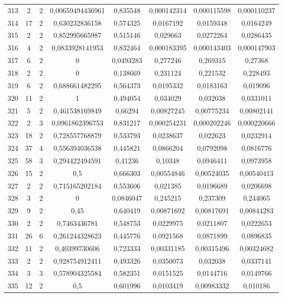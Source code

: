 \begin{longtable}{|c|c|c|c|c|c|c|c|}
313 & 2 & 2 & 0,00659494436961 & 0,835548 & 0,000142314 & 0,000115598 & 0,000110237  \\
314 & 17 & 2 & 0,630232836158 & 0,574325 & 0,0167192 & 0,0159348 & 0,0164249  \\
315 & 2 & 2 & 0,852995665987 & 0,515146 & 0,029663 & 0,0272264 & 0,0286435  \\
316 & 4 & 2 & 0,0833928141953 & 0,832464 & 0,000183395 & 0,000143403 & 0,000147903  \\
317 & 6 & 2 & 0 & 0,0493283 & 0,277246 & 0,269315 & 0,27368  \\
318 & 2 & 2 & 0 & 0,138669 & 0,231124 & 0,221532 & 0,228493  \\
319 & 6 & 2 & 0,688661482295 & 0,564373 & 0,0195332 & 0,0183163 & 0,019096  \\
320 & 11 & 2 & 1 & 0,494054 & 0,034029 & 0,032038 & 0,0331011  \\
321 & 5 & 2 & 0,461538169849 & 0,66294 & 0,00827245 & 0,00775234 & 0,00802141  \\
322 & 2 & 3 & 0,0961862396753 & 0,831217 & 0,000254231 & 0,000202246 & 0,000220666  \\
323 & 18 & 2 & 0,728557768879 & 0,533793 & 0,0238637 & 0,022623 & 0,0232914  \\
324 & 37 & 4 & 0,556394036538 & 0,445821 & 0,0866204 & 0,0792098 & 0,0816776  \\
325 & 58 & 3 & 0,294422494591 & 0,41236 & 0,10348 & 0,0946411 & 0,0973958  \\
326 & 15 & 2 & 0,5 & 0,666303 & 0,00554846 & 0,00524035 & 0,00540413  \\
327 & 2 & 2 & 0,715165202184 & 0,553606 & 0,021385 & 0,0196689 & 0,0206698  \\
328 & 3 & 2 & 0 & 0,0846047 & 0,245215 & 0,237309 & 0,244065  \\
329 & 9 & 2 & 0,45 & 0,640419 & 0,00871692 & 0,00817691 & 0,00844283  \\
330 & 2 & 2 & 0,7463436781 & 0,548753 & 0,0229975 & 0,0211807 & 0,0222653  \\
331 & 26 & 6 & 0,261244328623 & 0,445776 & 0,0921568 & 0,0871899 & 0,0896835  \\
332 & 11 & 2 & 0,40399730606 & 0,723333 & 0,00331185 & 0,00315496 & 0,00324682  \\
333 & 2 & 2 & 0,928754912411 & 0,493326 & 0,0350073 & 0,032038 & 0,0337141  \\
334 & 3 & 3 & 0,578904325584 & 0,582351 & 0,0151525 & 0,0144716 & 0,0149766  \\
335 & 12 & 2 & 0,5 & 0,601996 & 0,0103419 & 0,00983332 & 0,010186  \\

\end{longtable}
